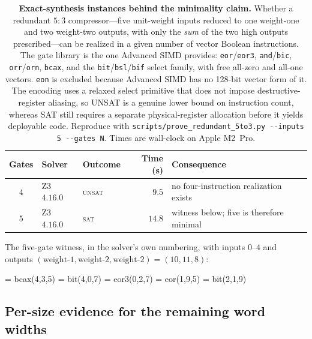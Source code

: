 \documentclass[fleqn,10pt]{wlscirep}
\begin{document}
\begin{table}[!ht]
\centering
\small\setlength{\tabcolsep}{5pt}
\caption{\label{stab:sat}\textbf{Exact-synthesis instances behind the minimality claim.} Whether a redundant $5{:}3$ compressor---five unit-weight inputs reduced to one weight-one and two weight-two outputs, with only the \emph{sum} of the two high outputs prescribed---can be realized in a given number of vector Boolean instructions. The gate library is the one Advanced SIMD provides: \texttt{eor}/\texttt{eor3}, \texttt{and}/\texttt{bic}, \texttt{orr}/\texttt{orn}, \texttt{bcax}, and the \texttt{bit}/\texttt{bsl}/\texttt{bif} select family, with free all-zero and all-one vectors. \texttt{eon} is excluded because Advanced SIMD has no 128-bit vector form of it. The encoding uses a relaxed select primitive that does not impose destructive-register aliasing, so UNSAT is a genuine lower bound on instruction count, whereas SAT still requires a separate physical-register allocation before it yields deployable code. Reproduce with \texttt{scripts/prove\_redundant\_5to3.py -{}-inputs 5 -{}-gates N}. Times are wall-clock on Apple M2~Pro.}
\begin{tabular}{@{}c | l l r l@{}}
\toprule
Gates & Solver & Outcome & Time (s) & Consequence\\
\midrule
$4$ & Z3 $4.16.0$ & \textsc{unsat} & $9.5$ & no four-instruction realization exists\\
$5$ & Z3 $4.16.0$ & \textsc{sat} & $14.8$ & witness below; five is therefore minimal\\
\bottomrule
\end{tabular}

\vspace{1ex}
\noindent The five-gate witness, in the solver's own numbering, with inputs $0$--$4$ and outputs $(\text{weight-}1, \text{weight-}2, \text{weight-}2) = (10, 11, 8)$:
\begin{center}
\small{} = bcax(4,3,5) = bit(4,0,7) = eor3(0,2,7) = eor(1,9,5) = bit(2,1,9)
\end{center}
\end{table}

\subsection*{Per-size evidence for the remaining word widths}
\end{document}
